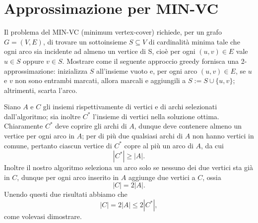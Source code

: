 \chapter{Approssimazione per MIN-VC}

\begin{problem*}
    Il problema del MIN-VC (minimum vertex-cover) richiede,
    per un grafo $G = (V, E)$, di trovare un sottoinsieme $S \subseteq V$ di cardinalità
    minima tale che ogni arco sia incidente ad almeno un vertice di S, cioè
    per ogni $(u, v)\in  E$ vale $u \in S$ oppure $v \in S$. Mostrare come il seguente approccio 
    greedy fornisca una 2-approssimazione: inizializza $S$ all’insieme vuoto e, per ogni arco 
    $(u, v) \in E$, se $u$ e $v$ non sono entrambi marcati, allora marcali e aggiungili a 
    $S := S \cup \{u, v\}$; altrimenti, scarta l’arco.
\end {problem*}

Siano $A$ e $C$ gli insiemi rispettivamente di vertici e di archi selezionati dall'algoritmo; sia inoltre $C^*$ l'insieme di vertici nella soluzione ottima.\newline
Chiaramente $C^*$ deve coprire gli archi di $A$, dunque deve contenere almeno un vertice per ogni arco in $A$; per di più due qualsiasi archi di $A$ non hanno vertici in comune, pertanto ciascun vertice di $C^*$ copre al più un arco di $A$, da cui \[|C^*|\ge|A|.\]
Inoltre il nostro algoritmo seleziona un arco solo se nessuno dei due vertici sta già in $C$, dunque per ogni arco inserito in $A$ aggiunge due vertici a $C$, ossia \[|C|=2|A|.\]
Unendo questi due risultati abbiamo che \[|C| = 2|A| \le 2|C^*|,\] come volevasi dimostrare. 
